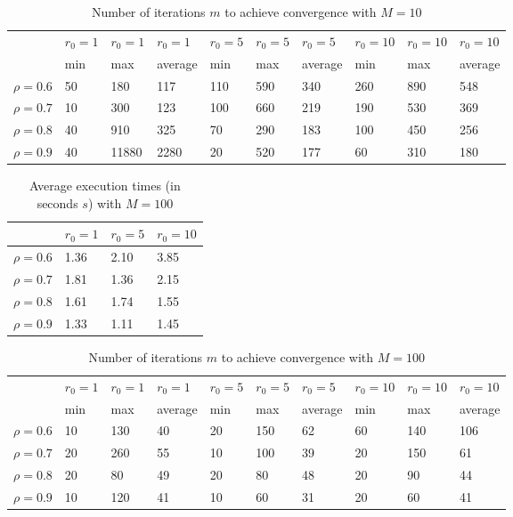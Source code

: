 \documentclass[a4paper,11pt,openright]{report}
\begin{document}
\begin{table}[H]
\centering
\addtolength{\leftskip}{-1.5cm}
\addtolength{\rightskip}{-1.5cm}
\begin{tabular}{|c|lllllllll|}
\hline
$ $ & $r_0 = 1$ & $r_0 = 1$ & $r_0 = 1$ & $r_0 = 5$ & $r_0 = 5$ & $r_0 = 5$ & $r_0 = 10$ & $r_0 = 10$ & $r_0 = 10$  \\
$ $ & min & max & average & min & max & average & min & max & average \\ 
\hline
$\rho = 0.6$ & 50 & 180 & 117 & 110 & 590 & 340 & 260 & 890 & 548 \\

$\rho = 0.7$ & 10 & 300 & 123 & 100 & 660 & 219 & 190 & 530 & 369\\

$\rho = 0.8$ & 40 & 910 & 325 & 70 & 290 & 183 & 100 & 450 & 256\\

$\rho = 0.9$ & 40 & 11880 & 2280 & 20 & 520 & 177 & 60 & 310 & 180\\
\hline
\end{tabular}
\caption{Number of iterations $m$ to achieve convergence with $M = 10$}
\end{table}
\begin{table}[H]
\centering
\addtolength{\leftskip}{-1.5cm}
\addtolength{\rightskip}{-1.5cm}
\begin{tabular}{|c|lll|}
\hline
$ $ & $r_0 = 1$ & $r_0 = 5$ & $r_0 = 10$ \\
\hline
$\rho = 0.6$ & 1.36 & 2.10 & 3.85 \\

$\rho = 0.7$ & 1.81 & 1.36 & 2.15 \\

$\rho = 0.8$ & 1.61 & 1.74 & 1.55 \\

$\rho = 0.9$ & 1.33 & 1.11 & 1.45 \\
\hline
\end{tabular}
\caption{Average execution
 times (in seconds $s$) with $M = 100$}
\end{table}
\begin{table}[H]
\centering
\addtolength{\leftskip}{-1.5cm}
\addtolength{\rightskip}{-1.5cm}
\begin{tabular}{|c|lllllllll|}
\hline
$ $ & $r_0 = 1$ & $r_0 = 1$ & $r_0 = 1$ & $r_0 = 5$ & $r_0 = 5$ & $r_0 = 5$ & $r_0 = 10$ & $r_0 = 10$ & $r_0 = 10$  \\
$ $ & min & max & average & min & max & average & min & max & average \\ 
\hline
$\rho = 0.6$ & 10 & 130 & 40 & 20 & 150 & 62 & 60 & 140 & 106 \\

$\rho = 0.7$ & 20 & 260 & 55 & 10 & 100 & 39 & 20 & 150 & 61\\

$\rho = 0.8$ & 20 & 80 & 49 & 20 & 80 & 48 & 20 & 90 & 44\\

$\rho = 0.9$ & 10 & 120 & 41 & 10 & 60 & 31 & 20 & 60 & 41\\
\hline
\end{tabular}
\caption{Number of iterations $m$ to achieve convergence with $M = 100$}
\end{table}
\end{document}
